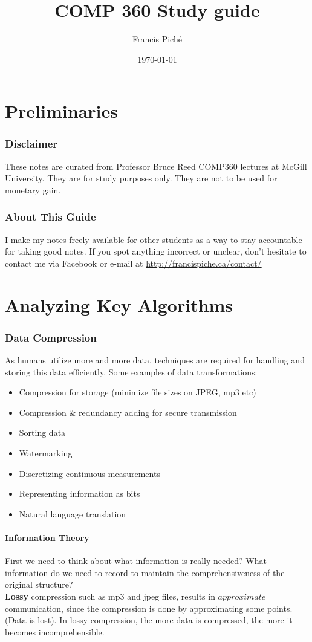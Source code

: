 \documentclass[12pt]{article}
\theoremstyle{definition}
\begin{document}
\title{COMP 360 Study guide}
\author{Francis Pich\'e}
\date{\today}
\maketitle
\newpage
\tableofcontents
\newpage

\part{Preliminaries}
\section{Disclaimer}
These notes are curated from Professor Bruce Reed COMP360 lectures at McGill University. They are for study purposes only. They are not to be used for monetary gain.
\section{About This Guide}
I make my notes freely available for other students as a way to stay accountable for taking good notes. If you spot anything incorrect or unclear, don't hesitate to contact me via Facebook or e-mail at \url{http://francispiche.ca/contact/}

\part{Analyzing Key Algorithms}
\section{Data Compression}
As humans utilize more and more data, techniques are required for handling and storing this data efficiently. Some examples of data transformations:
\begin{itemize}
	\item Compression for storage (minimize file sizes on JPEG, mp3 etc)
	\item Compression \& redundancy adding for secure transmission
	\item Sorting data
	\item Watermarking
	\item Discretizing continuous measurements
	\item Representing information as bits
	\item Natural language translation
\end{itemize}
\subsection{Information Theory}
First we need to think about what information is really needed? What information do we need to record to maintain the comprehensiveness of the original structure?
\\ \linebreak
\textbf{Lossy} compression such as mp3 and jpeg files, results in $approximate$ communication, since the compression is done by approximating some points. (Data is lost). In lossy compression, the more data is compressed, the more it becomes incomprehensible.
\\ \linebreak
\end{document}

